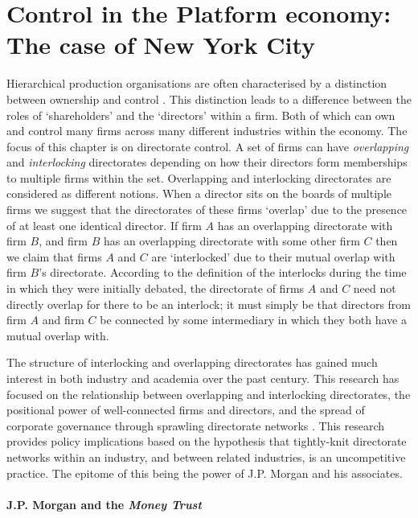 \chapter{Control in the Platform economy: The case of New York City}
\label{ch:ControlInNYC}

Hierarchical production organisations are often characterised by a distinction between ownership and control \citep{JensenMeckling1976, FamaJensen1983}. This distinction leads to a difference between the roles of `shareholders' and the `directors' within a firm. Both of which can own and control many firms across many different industries within the economy. The focus of this chapter is on directorate control. A set of firms can have \emph{overlapping} and \emph{interlocking} directorates depending on how their directors form memberships to multiple firms within the set. Overlapping and interlocking directorates are considered as different notions. When a director sits on the boards of multiple firms we suggest that the directorates of these firms `overlap' due to the presence of at least one identical director. If firm $A$ has an overlapping directorate with firm $B$, and firm $B$ has an overlapping directorate with some other firm $C$ then we claim that firms $A$ and $C$ are `interlocked' due to their mutual overlap with firm $B$'s directorate. According to the definition of the interlocks during the time in which they were initially debated, the directorate of firms $A$ and $C$ need not directly overlap for there to be an interlock; it must simply be that directors from firm $A$ and firm $C$ be connected by some intermediary in which they both have a mutual overlap with. 

The structure of interlocking and overlapping directorates has gained much interest in both industry and academia over the past century. This research has focused on the relationship between overlapping and interlocking directorates, the positional power of well-connected firms and directors, and the spread of corporate governance through sprawling directorate networks \citep{RoyBonacich1988}. This research provides policy implications based on the hypothesis that tightly-knit directorate networks within an industry, and between related industries, is an uncompetitive practice. The epitome of this being the power of J.P. Morgan and his associates.

\subsubsection{J.P. Morgan and the \emph{Money Trust}}

